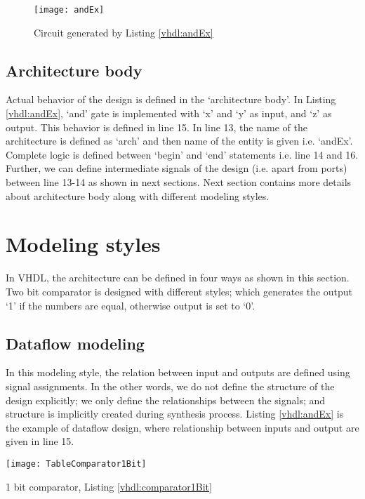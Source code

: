 \begin{figure}
	\centering
	\texttt{[image: andEx]}
	\caption{Circuit generated by Listing \ref{vhdl:andEx}}
	\label{fig:andEx}
\end{figure}



\subsection{Architecture body} 
Actual behavior of the design is defined in  the `architecture body'. In Listing \ref{vhdl:andEx}, `and' gate is implemented with `x' and `y' as input, and `z' as output. This behavior is defined in line 15. In line 13, the name of the architecture is defined as `arch' and then name of the entity is given i.e. `andEx'. Complete logic is defined between `begin' and `end' statements i.e. line 14 and 16. Further, we can define intermediate signals of the design (i.e. apart from ports) between line 13-14 as shown in next sections. Next section contains more details about architecture body along with different modeling styles. 

\section{Modeling styles}
In VHDL, the architecture can be defined in four ways as shown in this section. Two bit comparator is designed with different styles; which generates the output `1' if the numbers are equal, otherwise output is set to `0'.   

\subsection{Dataflow modeling}\label{sec:dataflowOverview}
In this modeling style, the relation between input and outputs are defined using signal assignments. In the other words, we do not define the structure of the design explicitly; we only define the relationships between the signals; and structure is implicitly created during synthesis process. Listing \ref{vhdl:andEx} is the example of dataflow design, where relationship between inputs and output are given in line 15. 

\begin{table}
	\centering
	\texttt{[image: TableComparator1Bit]}
	\caption{1 bit comparator, Listing \ref{vhdl:comparator1Bit}}
	\label{tbl:comparator1Bit}
\end{table}

